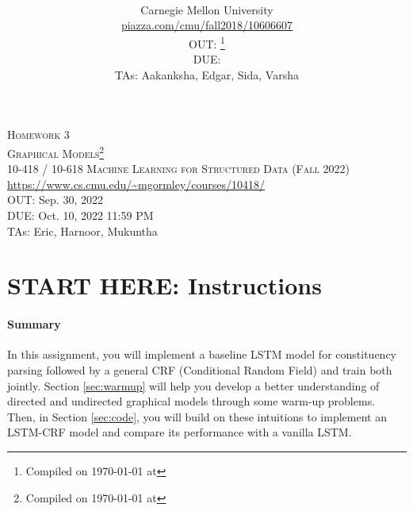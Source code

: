 \documentclass[11pt,addpoints,answers]{exam}
\title{\textsc{\hwName}} %
\author{\courseName\\
  Carnegie Mellon University \\
\url{piazza.com/cmu/fall2018/10606607} \\
OUT: \outDate{}\thanks{Compiled on \today{} at \currenttime{}} \\
DUE: \dueDate{} \\ 
TAs: Aakanksha, Edgar, Sida, Varsha}
\date{}
\date{}
\numberwithin{equation}{section} %
\numberwithin{figure}{section} %
\numberwithin{table}{section} %
\newcommand{\courseNum}{10-418 / 10-618}
\newcommand{\courseName}{Machine Learning for Structured Data}
\newcommand{\courseSem}{Fall 2022}
\newcommand{\piazzaUrl}{\url{https://www.cs.cmu.edu/~mgormley/courses/10418/}}
\newcommand{\hwNum}{Homework 3}
\newcommand{\hwTopic}{Graphical Models}
\newcommand{\outDate}{Sep. 30, 2022}
\newcommand{\dueDate}{Oct. 10, 2022 11:59 PM}
\newcommand{\taNames}{Eric, Harnoor, Mukuntha}
\begin{document}
\section*{}
\begin{center}
  \textsc{\LARGE \hwNum} \\
  \textsc{\LARGE \hwTopic\footnote{Compiled on \today{} at \currenttime{}}} \\
  \vspace{1em}
  \textsc{\large \courseNum{} \courseName{} (\courseSem)} \\
  \piazzaUrl\\
  \vspace{1em}
  OUT: \outDate \\
  DUE: \dueDate \\
  TAs: \taNames
\end{center}


\section*{START HERE: Instructions}

\vspace{-1em}
\begin{notebox}
\paragraph{Summary} In this assignment, you will implement a baseline LSTM  model for constituency parsing followed by a general  CRF (Conditional Random Field) and train both jointly. Section \ref{sec:warmup} will help you develop a better understanding of directed and undirected graphical models through some warm-up problems. Then, in Section \ref{sec:code}, you will build on these intuitions to implement an LSTM-CRF model and compare its performance with a vanilla LSTM.
\end{notebox}
\end{document}

